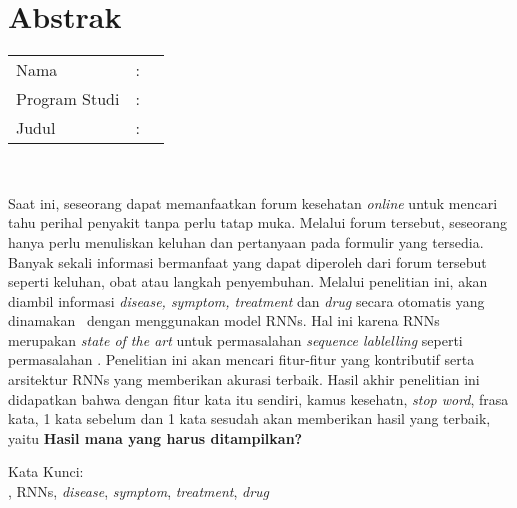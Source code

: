 %
%
%

\chapter*{Abstrak}

\vspace*{0.2cm}

\noindent \begin{tabular}{l l p{10cm}}
	Nama&: & \penulis \\
	Program Studi&: & \program \\
	Judul&: & \judul \\
\end{tabular} \\ 

\vspace*{0.5cm}

\noindent
Saat ini, seseorang dapat memanfaatkan forum kesehatan \textit{online} untuk mencari tahu perihal penyakit tanpa perlu tatap muka.  Melalui forum tersebut, seseorang hanya perlu menuliskan keluhan dan pertanyaan pada formulir yang tersedia. Banyak sekali informasi bermanfaat yang dapat diperoleh dari forum tersebut seperti keluhan, obat atau langkah penyembuhan. Melalui penelitian ini, akan diambil informasi \textit{disease, symptom, treatment} dan \textit{drug} secara otomatis yang dinamakan \mer~dengan menggunakan model RNNs. Hal ini karena RNNs merupakan \textit{state of the art} untuk permasalahan \textit{sequence lablelling} seperti permasalahan \mer. Penelitian ini akan mencari fitur-fitur yang kontributif serta arsitektur RNNs yang memberikan akurasi terbaik. Hasil akhir penelitian ini didapatkan bahwa dengan fitur kata itu sendiri, kamus kesehatn, \textit{stop word}, frasa kata, 1 kata sebelum dan 1 kata sesudah akan memberikan hasil yang terbaik, yaitu \textbf{Hasil mana yang harus ditampilkan?}


\vspace*{0.2cm}

\noindent Kata Kunci: \\ 
\noindent \mer, RNNs, \textit{disease}, \textit{symptom}, \textit{treatment}, \textit{drug} \\ 

\newpage